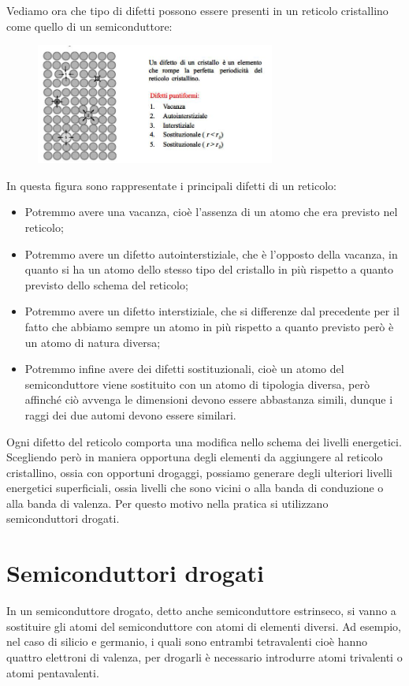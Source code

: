 \vspace{0.2cm}Vediamo ora che tipo di difetti possono essere presenti in un reticolo cristallino come quello di un semiconduttore:
\begin{figure}[H]
   \centering
   \includegraphics[width=0.7\textwidth]{immagini/difetti_cristallini.png}
\end{figure}
In questa figura sono rappresentate i principali difetti di un reticolo:
\begin{itemize}[leftmargin=0.5cm]
   \item Potremmo avere una vacanza, cioè l'assenza di un atomo che era previsto nel reticolo;
   \item Potremmo avere un difetto autointerstiziale, che è l'opposto della vacanza, in quanto si ha un atomo dello stesso tipo del cristallo in più rispetto a quanto previsto dello schema del reticolo;
   \item Potremmo avere un difetto interstiziale, che si differenze dal precedente per il fatto che abbiamo sempre un atomo in più rispetto a quanto previsto però è un atomo di natura diversa;
   \item Potremmo infine avere dei difetti sostituzionali, cioè un atomo del semiconduttore viene sostituito con un atomo di tipologia diversa, però affinché ciò avvenga le dimensioni devono essere abbastanza simili, dunque i raggi dei due automi devono essere similari.
\end{itemize}
Ogni difetto del reticolo comporta una modifica nello schema dei livelli energetici. Scegliendo però in maniera opportuna degli elementi da aggiungere al reticolo cristallino, ossia con opportuni drogaggi, possiamo generare degli ulteriori livelli energetici superficiali, ossia livelli che sono vicini o alla banda di conduzione o alla banda di valenza. Per questo motivo nella pratica si utilizzano semiconduttori drogati.

\section{Semiconduttori drogati}
In un semiconduttore drogato, detto anche semiconduttore estrinseco, si vanno a sostituire gli atomi del semiconduttore con atomi di elementi diversi. Ad esempio, nel caso di silicio e germanio, i quali sono entrambi tetravalenti cioè hanno quattro elettroni di valenza, per drogarli è necessario introdurre atomi trivalenti o atomi pentavalenti.


